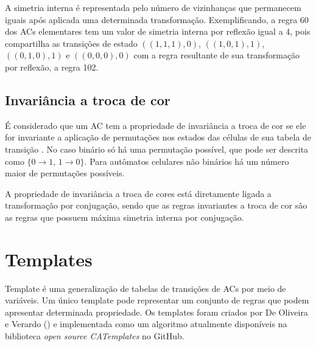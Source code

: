 \documentclass[12pt, a4paper]{article}
\begin{document}


A simetria interna é representada pelo número de vizinhanças que permanecem iguais após aplicada uma determinada transformação. Exemplificando, a regra 60 dos ACs elementares tem um valor de simetria interna por reflexão igual a 4, pois compartilha as transições de estado $((1,1,1),0)$, $((1,0,1),1)$, $((0,1,0),1)$ e $ ((0,0,0),0)$ com a regra resultante de sua transformação por reflexão, a regra 102.

\subsection{Invariância a troca de cor}
É considerado que um AC tem a propriedade de invariância a troca de cor se ele for invariante a aplicação de permutações nos estados das células de sua tabela de transição \cite{salo2013color}. No caso binário só há uma permutação possível, que pode ser descrita como $\{0 \to 1 ,\, 1 \to 0\}$. Para autômatos celulares não binários há um número maior de permutações possíveis.

A propriedade de invariância a troca de cores está diretamente ligada a transformação por conjugação, sendo que as regras invariantes a troca de cor são as regras que possuem máxima simetria interna por conjugação.

\section{Templates}
\label{sec:templates}
Template é uma generalização de tabelas de transições de ACs por meio de variáveis. Um único template pode representar um conjunto de regras que podem apresentar determinada propriedade. Os templates foram criados por De Oliveira e Verardo (\citeyear{deOliveira2014}) e implementada como um algoritmo 
atualmente disponíveis na biblioteca \textit{open source CATemplates} \cite{CATemplates} no GitHub.
\end{document}
